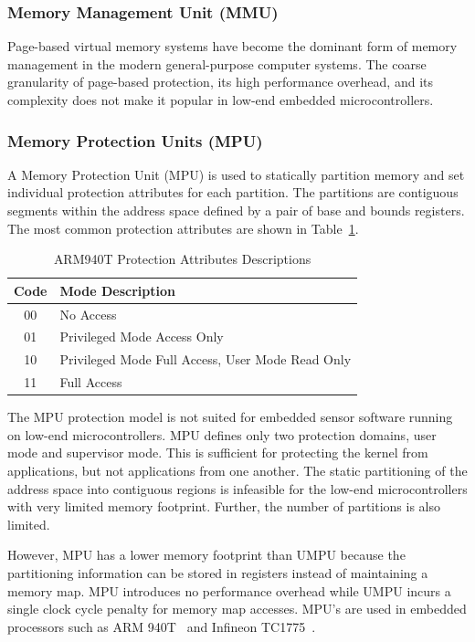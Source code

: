 \subsubsection{Memory Management Unit (MMU)}
%
Page-based virtual memory systems have become the dominant form of
memory management in the modern general-purpose computer systems.
%
The coarse granularity of page-based protection, its high performance
overhead, and its complexity does not make it popular in low-end
embedded microcontrollers.
%
%
\subsubsection{Memory Protection Units (MPU)}
\label{sec:mpu}
%
A Memory Protection Unit (MPU) is used to statically partition memory
and set individual protection attributes for each partition.
%
The partitions are contiguous segments within the address space
defined by a pair of base and bounds registers.
%
The most common protection attributes are shown in
Table~\ref{tab:armprotattr}.
%
\begin{table}[htdp]
\centering
\small{
\begin{tabular}{|c|l|}
	\hline
	Code & Mode Description\\
	\hline
        00 & No Access \\
        01 & Privileged Mode Access Only \\
        10 & Privileged Mode Full Access, User Mode Read Only \\
        11 & Full Access\\
	\hline
\end{tabular}}
\caption{ARM940T Protection Attributes Descriptions}
\label{tab:armprotattr}
\end{table}
%

The MPU protection model is not suited for embedded sensor
software running on low-end microcontrollers.
%
MPU defines only two protection domains, user mode and supervisor
mode.
%
This is sufficient for protecting the kernel from applications, but
not applications from one another.
%
The static partitioning of the address space into contiguous regions is
infeasible for the low-end microcontrollers with very limited memory
footprint.
%
Further, the number of partitions is also limited.
%

However, MPU has a lower memory footprint than UMPU because the
partitioning information can be stored in registers instead of
maintaining a memory map.
%
MPU introduces no performance overhead while UMPU incurs a single
clock cycle penalty for memory map accesses.
%
MPU's are used in embedded processors such as ARM
940T~\cite{arm940tds} and Infineon TC1775~\cite{inftc1775ds}.
